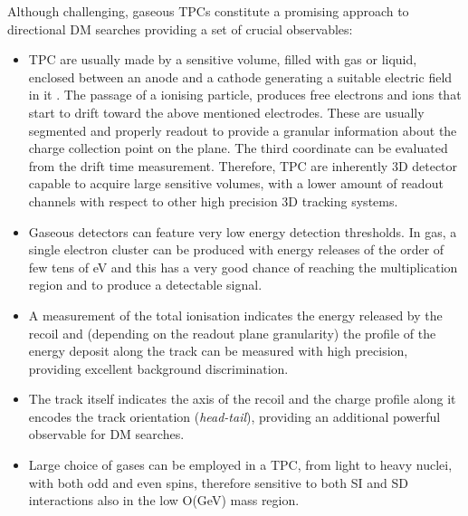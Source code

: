 \documentclass[physics,article,submit,moreauthors,pdftex]{Definitions/mdpi}
\begin{document}
Although challenging, gaseous TPCs constitute a promising approach to directional DM searches providing a set of crucial  observables:
\begin{itemize}

\item TPC are usually made by a sensitive volume, filled with gas or liquid, enclosed between an anode and a cathode generating a suitable electric field in it \cite{bib:tpc1, bib:tpc2, bib:tpc3}. The passage of a ionising particle, produces free electrons and ions that start to drift toward the above mentioned electrodes. These are usually segmented and properly readout to provide a granular information about the charge collection point on the plane. The third coordinate can be evaluated from the drift time measurement.
Therefore, TPC are inherently 3D detector capable to acquire large sensitive volumes, with a lower amount of readout channels with respect to other high precision 3D tracking systems.

\item Gaseous detectors can feature very low energy detection thresholds. In gas, a single electron cluster can be produced with energy releases of the order of few tens of eV and this has a very good chance of reaching the multiplication region and to produce a detectable signal.

\item A measurement of the  total ionisation indicates the energy released by the recoil and (depending on the readout plane granularity) the profile of the energy deposit along the track can be measured with high precision, providing excellent background discrimination.

\item The track itself indicates the axis of the recoil and the charge profile along it encodes the track orientation ({\it head-tail}), providing an additional powerful observable for DM searches. 

\item  Large choice of gases can be employed in a TPC, from light to heavy nuclei, with both odd and even spins, therefore sensitive to both SI and SD interactions also in the low O(GeV) mass region.


\end{itemize}
\end{document}

